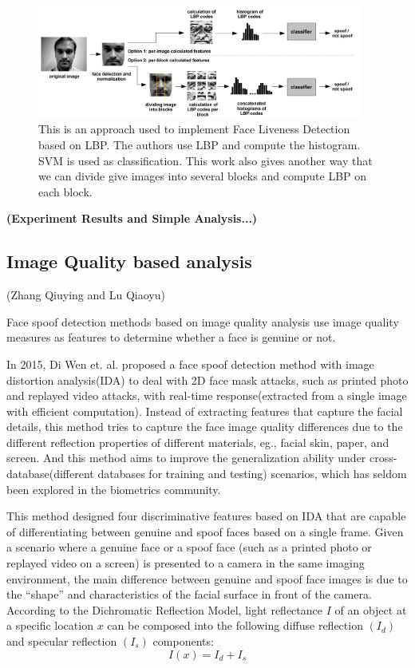 \documentclass[journal]{IEEEtran}
\begin{document}
\begin{figure}[htbp]
\centering
\includegraphics[width=0.95\textwidth]{img/2-A-(1).png}
\caption{This is an approach \cite{chingovska2012effectiveness} used to implement Face Liveness Detection based on LBP. The authors use LBP and compute the histogram. SVM is used as classification. This work also gives another way that we can divide give images into several blocks and compute LBP on each block.}
\label{lbp_based_approach}
\end{figure}

\bigskip

\textbf{(Experiment Results and Simple Analysis...)}


\subsection{Image Quality based analysis}

(Zhang Qiuying and Lu Qiaoyu)

Face spoof detection methods based on image quality analysis use image quality measures as features to determine whether a face is genuine or not.

In 2015, Di Wen et. al.\cite{wen2015face} proposed a face spoof detection method with image distortion analysis(IDA) to deal with 2D face mask attacks, such as printed photo and replayed video attacks, with real-time response(extracted from a single image with efficient computation). Instead of extracting features that capture the facial details, this method tries to capture the face image quality differences due to the different reflection properties of different materials, eg., facial skin, paper, and screen. And this method aims to improve the generalization ability under cross-database(different databases for training and testing) scenarios, which has seldom been explored in the biometrics community.

This method designed four discriminative features based on IDA that are capable of differentiating between genuine and spoof faces based on a single frame. Given a scenario where a genuine face or a spoof face (such as a printed photo or replayed video on a screen) is presented to a camera in the same imaging environment, the main difference between genuine and spoof face images is due to the “shape” and characteristics of the facial surface in front of the camera. According to the Dichromatic Reflection Model\cite{shafer1985using}, light reflectance $I$ of an object at a specific location $x$ can be composed into the following diffuse reflection $(I_d)$ and specular reflection $(I_s)$ components:
\begin{equation}
I(x)=I_d+I_s
\end{equation}
\end{document}
